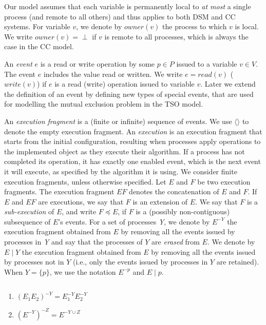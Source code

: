 Our model assumes that each variable is permanently local to \emph{at most} a single process (and remote to all others) and thus applies to both DSM and CC systems.
For variable $v$, we denote by $owner(v)$ the process to which $v$ is local.
We write $owner(v) = \perp$ if $v$ is remote to all processes, which is always the case in the CC model.


An \emph{event} $e$ is a read or write operation by some $p \in P$ issued to a variable $v \in V$.
The event $e$ includes the value read or written. We write $e = read(v)$ ($write(v)$) if $e$ is a read (write)
operation issued to variable $v$. Later we extend the definition of an event by defining
new types of special events, that are used for modelling the mutual exclusion problem in the TSO model.

An \emph{execution fragment} is a (finite or infinite) sequence of events. We use $\langle \rangle$ to denote the empty execution fragment. An \emph{execution} is an execution fragment that starts from the initial configuration, resulting when processes apply operations to the implemented object as they execute their algorithm. If a process has not completed its operation, it has exactly one enabled event, which is the next event it will execute, as specified by the algorithm it is using. We consider finite execution fragments, unless otherwise specified.
Let $E$ and $F$ be two execution fragments. The execution fragment $E F$ denotes the concatenation of $E$ and $F$. If $E$ and $E F$ are executions, we say that $F$ is an extension of $E$.
We say that $F$ is a \emph{sub-execution} of $E$, and write $F \preceq E$, if $F$ is a (possibly non-contiguous)
subsequence of $E$'s events. For a set of processes \emph{Y}, we denote by $E^{-Y}$
the execution fragment obtained from $E$ by removing all the events issued by processes in \emph{Y}
and say that the processes of $Y$ are \emph{erased} from $E$. We denote by $E \mid Y$ the execution fragment obtained from $E$ by removing all the events issued by processes not in $Y$ (i.e., only the events issued by processes in $Y$ are retained). When $Y = \{p\}$, we use the notation $E^{-p}$ and $E \mid p$.

\begin{fact}
	$ $
	\begin{enumerate}
		\item $(E_1 E_2)^{-Y} = E_1^{-Y} E_2^{-Y}$
		\item $(E^{-Y})^{-Z} = E^{-Y \cup Z}$
	\end{enumerate}
\end{fact}


